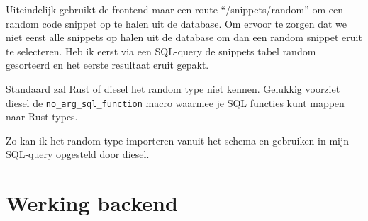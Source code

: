 Uiteindelijk gebruikt de frontend maar een route “/snippets/random” om een random code snippet op te
halen uit de database. Om ervoor te zorgen dat we niet eerst alle snippets op halen uit de database
om dan een random snippet eruit te selecteren. Heb ik eerst via een SQL-query de snippets tabel
random gesorteerd en het eerste resultaat eruit gepakt.  

Standaard zal Rust of diesel het random type niet kennen. Gelukkig voorziet diesel de
\texttt{no_arg_sql_function} macro waarmee je SQL functies kunt mappen naar Rust types.

Zo kan ik het random type importeren vanuit het schema en gebruiken in mijn SQL-query opgesteld door diesel.

\section{Werking backend}
